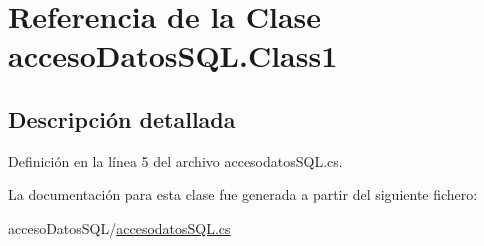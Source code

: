 \hypertarget{classacceso_datos_s_q_l_1_1_class1}{}\section{Referencia de la Clase acceso\+Datos\+S\+Q\+L.\+Class1}
\label{classacceso_datos_s_q_l_1_1_class1}


\subsection{Descripción detallada}


Definición en la línea 5 del archivo accesodatos\+S\+Q\+L.\+cs.



La documentación para esta clase fue generada a partir del siguiente fichero\+:\begin{DoxyCompactItemize}
\item 
acceso\+Datos\+S\+Q\+L/\mbox{\hyperlink{acceso_datos_s_q_l_2accesodatos_s_q_l_8cs}{accesodatos\+S\+Q\+L.\+cs}}\end{DoxyCompactItemize}
